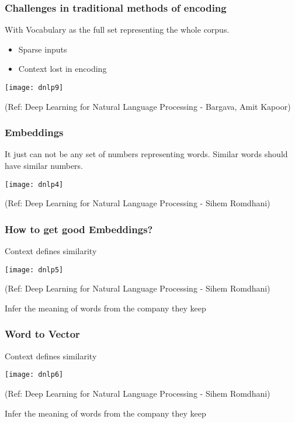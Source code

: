 \begin{frame}[fragile]\frametitle{Challenges in traditional methods of encoding}
With Vocabulary as the full set representing the whole corpus.
	\begin{itemize}
	\item Sparse inputs
	\item   Context lost in encoding
	\end{itemize}

\begin{center}
\texttt{[image: dnlp9]}

\tiny{(Ref:  Deep Learning for Natural Language Processing - Bargava,  Amit Kapoor)}
\end{center}

\end{frame}


\begin{frame}[fragile]\frametitle{Embeddings}
It just can not be any set of numbers representing words. Similar words should have similar numbers.

\begin{center}
\texttt{[image: dnlp4]}

\tiny{(Ref:  Deep Learning for Natural Language Processing - Sihem Romdhani)}
\end{center}
\end{frame}


\begin{frame}[fragile]\frametitle{How to get good Embeddings?}
Context defines similarity

\begin{center}
\texttt{[image: dnlp5]}

\tiny{(Ref:  Deep Learning for Natural Language Processing - Sihem Romdhani)}
\end{center}

Infer the meaning of words from the company they keep
\end{frame}

\begin{frame}[fragile]\frametitle{Word to Vector}
Context defines similarity

\begin{center}
\texttt{[image: dnlp6]}

\tiny{(Ref:  Deep Learning for Natural Language Processing - Sihem Romdhani)}
\end{center}

Infer the meaning of words from the company they keep
\end{frame}

